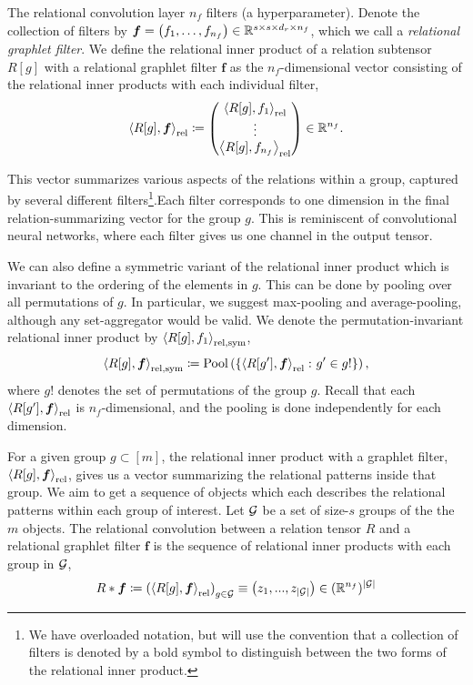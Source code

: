 The relational convolution layer $n_f$ filters (a hyperparameter). Denote the collection of filters by $\boldsymbol{f} = \left(f_1, \ldots, f_{n_f}\right) \in \mathbb{R}^{s \times s \times d_r \times n_f}$, which we call a \textit{relational graphlet filter}. We define the relational inner product of a relation subtensor $R[g]$ with a relational graphlet filter $\bm{f}$ as the $n_f$-dimensional vector consisting of the relational inner products with each individual filter,
\begin{equation}
    \label{eq:relational_inner_prod}
    \left\langle R[g], \bm{f} \right\rangle_\mathrm{rel} \coloneq \begin{pmatrix} \left\langle R[g], f_1 \right\rangle_\mathrm{rel} \\ \vdots 
 \\ \left\langle R[g], f_{n_f} \right\rangle_\mathrm{rel} \end{pmatrix} \in \mathbb{R}^{n_f}.
\end{equation}

This vector summarizes various aspects of the relations within a group, captured by several different filters\footnote{We have overloaded notation, but will use the convention that a collection of filters is denoted by a bold symbol to distinguish between the two forms of the relational inner product.}.Each filter corresponds to one dimension in the final relation-summarizing vector for the group $g$. This is reminiscent of convolutional neural networks, where each filter gives us one channel in the output tensor.

We can also define a symmetric variant of the relational inner product which is invariant to the ordering of the elements in $g$. This can be done by pooling over all permutations of $g$. In particular, we suggest max-pooling and average-pooling, although any set-aggregator would be valid. We denote the permutation-invariant relational inner product by $\left \langle R[g], f_1 \right\rangle_{\mathrm{rel}, \mathrm{sym}}$,
\begin{equation}\label{eq:symmetric_relational_inner_prod}
    \left \langle R[g], \bm{f} \right\rangle_{\mathrm{rel}, \mathrm{sym}} \coloneq \mathrm{Pool}\left(\left\{\left\langle R[g'], \bm{f} \right\rangle_\mathrm{rel} \colon g' \in g!\right\}\right),
\end{equation}
\noindent where $g!$ denotes the set of permutations of the group $g$. Recall that each $\left \langle R[g'], \bm{f} \right\rangle_{\mathrm{rel}}$ is $n_f$-dimensional, and the pooling is done independently for each dimension.

For a given group $g \subset [m]$, the relational inner product with a graphlet filter, $\left \langle R[g], \bm{f} \right\rangle_\mathrm{rel}$, gives us a vector summarizing the relational patterns inside that group. We aim to get a sequence of objects which each describes the relational patterns within each group of interest. Let ${\mathcal{G}}$ be a set of size-$s$ groups of the the $m$ objects. The relational convolution between a relation tensor $R$ and a relational graphlet filter $\bm{f}$ is the sequence of relational inner products with each group in ${\mathcal{G}}$,
\begin{equation}
    \label{eq:relational_convolution}
    R \ast \bm{f} \coloneq \left( \left\langle R[g], \boldsymbol{f} \right\rangle_\mathrm{rel} \right)_{g \in {\mathcal{G}}} \equiv \left(z_1, ..., z_{\left\lvert{\mathcal{G}}\right\rvert}\right) \in (\mathbb{R}^{n_f})^{\left\lvert{\mathcal{G}}\right\rvert}
\end{equation}


